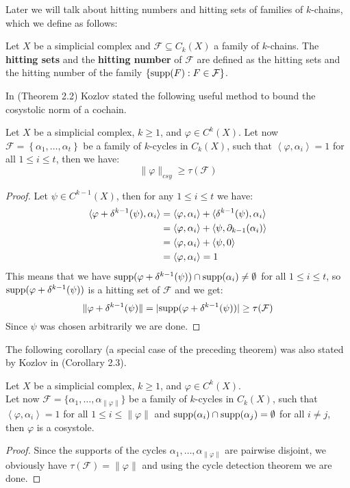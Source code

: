 Later we will talk about hitting numbers and hitting sets of families of \(k\)-chains, which we define as follows:

\begin{defi}
Let \(X\) be a simplicial complex and \(\mathcal{F}\subseteq C_k(X)\) a family of \(k\)-chains. The \textbf{hitting sets} and the \textbf{hitting number} of \(\mathcal{F}\) are defined as the hitting sets and the hitting number of the family \(\left\{\mathrm{supp}(F):F\in\mathcal{F}\right\}\).
\end{defi}

In \cite{6} (Theorem 2.2) Kozlov stated the following useful method to bound the cosystolic norm of a cochain.

\begin{thm}\label{theorem9}
Let \(X\) be a simplicial complex, \(k\geq 1\), and \(\varphi\in C^k(X)\). Let now \(\mathcal{F}=\left\{\alpha_1,\ldots,\alpha_t\right\}\) be a family of \(k\)-cycles in \(C_k(X)\), such that \(\left\langle\varphi,\alpha_i\right\rangle=1\) for all \(1\leq i\leq t\), then we have:
\[
\|\varphi\|_{csy}\geq\tau(\mathcal{F})
\]
\begin{proof}
Let \(\psi\in C^{k-1}(X)\), then for any \(1\leq i\leq t\) we have:
\begin{align}
\langle\varphi+\delta^{k-1}(\psi),\alpha_i\rangle&=\langle\varphi,\alpha_i\rangle+\langle\delta^{k-1}(\psi),\alpha_i\rangle\notag\\
&=\langle\varphi,\alpha_i\rangle+\langle\psi,\partial_{k-1}(\alpha_i)\rangle\notag\\
&=\langle\varphi,\alpha_i\rangle+\langle\psi,0\rangle\notag\\
&=\langle\varphi,\alpha_i\rangle=1\notag
\end{align}
This means that we have \(\mathrm{supp}(\varphi+\delta^{k-1}(\psi))\cap \mathrm{supp}(\alpha_i)\neq\emptyset\) for all \(1\leq i\leq t\), so \(\mathrm{supp}(\varphi+\delta^{k-1}(\psi))\) is a hitting set of \(\mathcal{F}\) and we get:
\[
\|\varphi+\delta^{k-1}(\psi)\|=|\mathrm{supp}(\varphi+\delta^{k-1}(\psi))|\geq\tau(\mathcal{F})
\]
Since \(\psi\) was chosen arbitrarily we are done.
\end{proof}
\end{thm}
The following corollary (a special case of the preceding theorem) was also stated by Kozlov in \cite{6} (Corollary 2.3).

\begin{cor}\label{corollary1}
Let \(X\) be a simplicial complex, \(k\geq 1\), and \(\varphi\in C^k(X)\).\\
Let now \(\mathcal{F}=\{\alpha_1,\ldots,\alpha_{\|\varphi\|}\}\) be a family of \(k\)-cycles in \(C_k(X)\), such that \(\left\langle\varphi,\alpha_i\right\rangle=1\) for all \(1\leq i\leq\|\varphi\|\) and \(\mathrm{supp}(\alpha_i)\cap \mathrm{supp}(\alpha_j)=\emptyset\) for all \(i\neq j\), then \(\varphi\) is a cosystole.
\begin{proof}
Since the supports of the cycles \(\alpha_1,\ldots,\alpha_{\|\varphi\|}\) are pairwise disjoint, we obviously have \(\tau(\mathcal{F})=\|\varphi\|\) and using the cycle detection theorem we are done.
\end{proof}
\end{cor}


